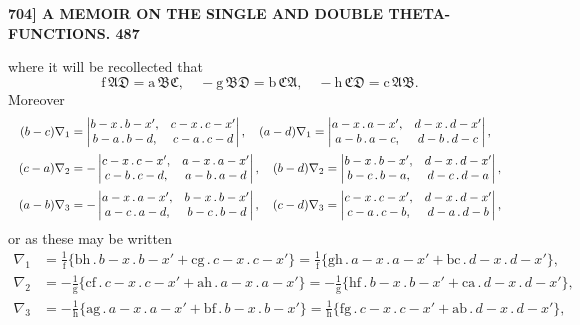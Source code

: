 \documentclass[11pt]{article}
\newcommand{\Ag}{\mathfrak{A}}
\newcommand{\Bg}{\mathfrak{B}}
\newcommand{\Cg}{\mathfrak{C}}
\newcommand{\Dg}{\mathfrak{D}}
\begin{document}
\bigskip
\noindent\textbf{704] \hfill A MEMOIR ON THE SINGLE AND DOUBLE THETA-FUNCTIONS. \hfill 487}

\medskip
where it will be recollected that
\[
\mathrm{f}\,\Ag\Dg = \mathrm{a}\,\Bg\Cg,\quad -\mathrm{g}\,\Bg\Dg = \mathrm{b}\,\Cg\Ag,\quad -\mathrm{h}\,\Cg\Dg = \mathrm{c}\,\Ag\Bg.
\]
Moreover
\[
\resizebox{\textwidth}{!}{$\displaystyle
\begin{aligned}
(b-c)\nabla_1 &= \begin{vmatrix} b-x\,.\,b-x', & c-x\,.\,c-x'\\ b-a\,.\,b-d, & c-a\,.\,c-d \end{vmatrix},\quad
(a-d)\nabla_1 = \begin{vmatrix} a-x\,.\,a-x', & d-x\,.\,d-x'\\ a-b\,.\,a-c, & d-b\,.\,d-c \end{vmatrix},\\[2pt]
(c-a)\nabla_2 &= -\begin{vmatrix} c-x\,.\,c-x', & a-x\,.\,a-x'\\ c-b\,.\,c-d, & a-b\,.\,a-d \end{vmatrix},\quad
(b-d)\nabla_2 = \begin{vmatrix} b-x\,.\,b-x', & d-x\,.\,d-x'\\ b-c\,.\,b-a, & d-c\,.\,d-a \end{vmatrix},\\[2pt]
(a-b)\nabla_3 &= -\begin{vmatrix} a-x\,.\,a-x', & b-x\,.\,b-x'\\ a-c\,.\,a-d, & b-c\,.\,b-d \end{vmatrix},\quad
(c-d)\nabla_3 = \begin{vmatrix} c-x\,.\,c-x', & d-x\,.\,d-x'\\ c-a\,.\,c-b, & d-a\,.\,d-b \end{vmatrix},
\end{aligned}$}
\]
or as these may be written
\[
\begin{aligned}
\nabla_1 &= \tfrac{1}{\mathrm{f}}\{\mathrm{b}\mathrm{h}\,.\,b-x\,.\,b-x' + \mathrm{c}\mathrm{g}\,.\,c-x\,.\,c-x'\} = \tfrac{1}{\mathrm{f}}\{\mathrm{g}\mathrm{h}\,.\,a-x\,.\,a-x' + \mathrm{b}\mathrm{c}\,.\,d-x\,.\,d-x'\},\\
\nabla_2 &= -\tfrac{1}{\mathrm{g}}\{\mathrm{c}\mathrm{f}\,.\,c-x\,.\,c-x' + \mathrm{a}\mathrm{h}\,.\,a-x\,.\,a-x'\} = -\tfrac{1}{\mathrm{g}}\{\mathrm{h}\mathrm{f}\,.\,b-x\,.\,b-x' + \mathrm{c}\mathrm{a}\,.\,d-x\,.\,d-x'\},\\
\nabla_3 &= -\tfrac{1}{\mathrm{h}}\{\mathrm{a}\mathrm{g}\,.\,a-x\,.\,a-x' + \mathrm{b}\mathrm{f}\,.\,b-x\,.\,b-x'\} = \tfrac{1}{\mathrm{h}}\{\mathrm{f}\mathrm{g}\,.\,c-x\,.\,c-x' + \mathrm{a}\mathrm{b}\,.\,d-x\,.\,d-x'\},
\end{aligned}
\]
\end{document}

